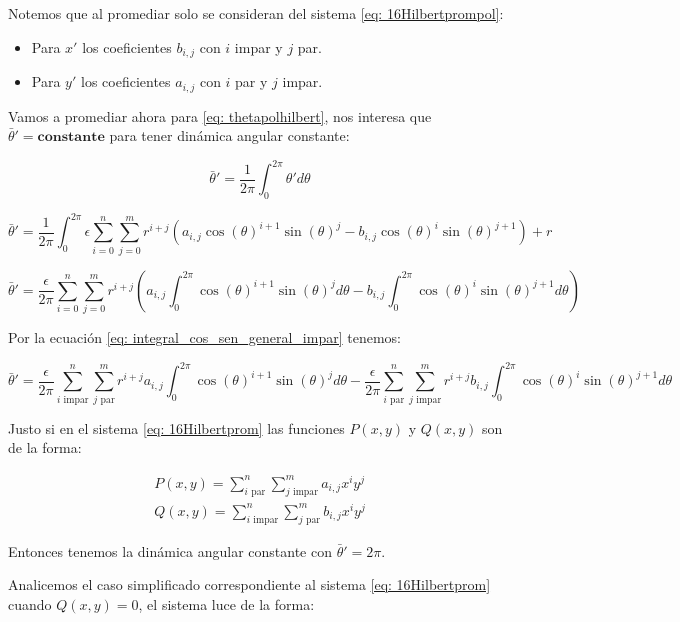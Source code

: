 Notemos que al promediar solo se consideran del sistema \eqref{eq: 16Hilbertprompol}:
\begin{itemize}
	\item Para $x'$ los coeficientes $b_{i,j}$ con $i$ impar y $j$ par.
	\item Para $y'$ los coeficientes $a_{i,j}$ con $i$ par y $j$ impar.
\end{itemize}

Vamos a promediar ahora para \eqref{eq: thetapolhilbert}, nos interesa que $\bar{\theta}'=\textbf{constante}$ para tener dinámica angular constante:

\[
\bar{\theta}'=\frac{1}{2\pi}\int_{0}^{2\pi}\theta'd\theta
\]

\[
\bar{\theta}'=\frac{1}{2\pi}\int_{0}^{2\pi}\epsilon\sum_{i=0}^{n}\sum_{j=0}^{m}r^{i+j}(a_{i,j}\cos(\theta)^{i+1}\sin(\theta)^j-b_{i,j}\cos(\theta)^{i}\sin(\theta)^{j+1})+r
\]

\[
\bar{\theta}'=\frac{\epsilon}{2\pi}\sum_{i=0}^{n}\sum_{j=0}^{m}r^{i+j}\left(a_{i,j}\int_{0}^{2\pi}\cos(\theta)^{i+1}\sin(\theta)^j d\theta-b_{i,j}\int_{0}^{2\pi}\cos(\theta)^{i}\sin(\theta)^{j+1} d\theta\right)
\]

Por la ecuación \eqref{eq: integral_cos_sen_general_impar} tenemos:

\[
\bar{\theta}'=\frac{\epsilon}{2\pi}\sum_{i \text{ impar}}^{n}\sum_{j \text{ par}}^{m}r^{i+j}a_{i,j}\int_{0}^{2\pi}\cos(\theta)^{i+1}\sin(\theta)^j d\theta-\frac{\epsilon}{2\pi}\sum_{i \text{ par}}^{n}\sum_{j \text{ impar}}^{m}r^{i+j}b_{i,j}\int_{0}^{2\pi}\cos(\theta)^{i}\sin(\theta)^{j+1} d\theta
\]

Justo si en el sistema \eqref{eq: 16Hilbertprom} las funciones $P(x,y)$ y $Q(x,y)$ son de la forma:

\begin{equation}\label{eq: 16HilbertPromPol}
	\begin{matrix}
		P(x,y) = \sum_{i \text{ par}}^{n} \sum_{j \text{ impar}}^{m} a_{i,j} x^i y^j \\
		Q(x,y) = \sum_{i \text{ impar}}^{n} \sum_{j \text{ par}}^{m} b_{i,j} x^i y^j
	\end{matrix}
\end{equation}

Entonces tenemos la dinámica angular constante con $\bar{\theta}'=2\pi$.

Analicemos el caso simplificado correspondiente al sistema \eqref{eq: 16Hilbertprom} cuando $Q(x,y)=0$, el sistema luce de la forma:


